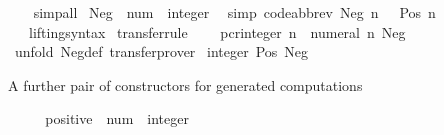 \begin{isabellebody}
%
\isadelimproof
\ \ %
\endisadelimproof
%
\isatagproof
{}\isamarkupfalse%
\ simp{\isacharunderscore}{\kern0pt}all%
\endisatagproof
{\isafoldproof}%
%
\isadelimproof
\isanewline
%
\endisadelimproof
\isanewline
{}\isamarkupfalse%
\ Neg\ {\isacharcolon}{\kern0pt}{\isacharcolon}{\kern0pt}\ {\isachardoublequoteopen}num\ {\isasymRightarrow}\ integer{\isachardoublequoteclose}\isanewline
{}\isanewline
\ \ {\isacharbrackleft}{\kern0pt}simp{\isacharcomma}{\kern0pt}\ code{\isacharunderscore}{\kern0pt}abbrev{\isacharbrackright}{\kern0pt}{\isacharcolon}{\kern0pt}\ {\isachardoublequoteopen}Neg\ n\ {\isacharequal}{\kern0pt}\ {\isacharminus}{\kern0pt}\ Pos\ n{\isachardoublequoteclose}\isanewline
\isanewline
{}\isamarkupfalse%
\isanewline
\ \ \ lifting{\isacharunderscore}{\kern0pt}syntax\isanewline
{}\isanewline
\isanewline
{}\isamarkupfalse%
\ {\isacharbrackleft}{\kern0pt}transfer{\isacharunderscore}{\kern0pt}rule{\isacharbrackright}{\kern0pt}{\isacharcolon}{\kern0pt}\isanewline
\ \ {\isacartoucheopen}{\isacharparenleft}{\kern0pt}{\isacharparenleft}{\kern0pt}{\isacharequal}{\kern0pt}{\isacharparenright}{\kern0pt}\ {\isacharequal}{\kern0pt}{\isacharequal}{\kern0pt}{\isacharequal}{\kern0pt}{\isachargreater}{\kern0pt}\ pcr{\isacharunderscore}{\kern0pt}integer{\isacharparenright}{\kern0pt}\ {\isacharparenleft}{\kern0pt}{\isasymlambda}n{\isachardot}{\kern0pt}\ {\isacharminus}{\kern0pt}\ numeral\ n{\isacharparenright}{\kern0pt}\ Neg{\isacartoucheclose}\isanewline
%
\isadelimproof
\ \ %
\endisadelimproof
%
\isatagproof
{}\isamarkupfalse%
\ {\isacharparenleft}{\kern0pt}unfold\ Neg{\isacharunderscore}{\kern0pt}def{\isacharparenright}{\kern0pt}\ transfer{\isacharunderscore}{\kern0pt}prover%
\endisatagproof
{\isafoldproof}%
%
\isadelimproof
\isanewline
%
\endisadelimproof
\isanewline
{}\isamarkupfalse%
\isanewline
\isanewline
{}\isamarkupfalse%
\ {\isachardoublequoteopen}{}{\isacharcolon}{\kern0pt}{\isacharcolon}{\kern0pt}integer{\isachardoublequoteclose}\ Pos\ Neg%
\begin{isamarkuptext}%
A further pair of constructors for generated computations%
\end{isamarkuptext}\isamarkuptrue%
\isamarkupfalse%
\isanewline
{}\ \ \isanewline
\isanewline
{}\ \isamarkupfalse%
\ positive\ {\isacharcolon}{\kern0pt}{\isacharcolon}{\kern0pt}\ {\isachardoublequoteopen}num\ {\isasymRightarrow}\ integer{\isachardoublequoteclose}\isanewline

\end{isabellebody}
